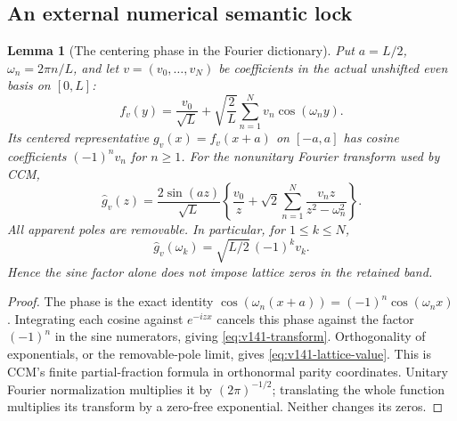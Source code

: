 \documentclass[11pt]{article}
\newtheorem{lemma}[theorem]{Lemma}
\theoremstyle{remark}
\begin{document}
\subsection*{An external numerical semantic lock}

\begin{lemma}[The centering phase in the Fourier dictionary]
\label{lem:v141-centering}
Put $a=L/2$, $\omega_n=2\pi n/L$, and let $v=(v_0,\ldots,v_N)$
be coefficients in the actual unshifted even basis on $[0,L]$:
\[
 f_v(y)=\frac{v_0}{\sqrt L}
       +\sqrt{\frac2L}\sum_{n=1}^Nv_n\cos(\omega_n y).
\]
Its centered representative $g_v(x)=f_v(x+a)$ on $[-a,a]$ has
cosine coefficients $(-1)^nv_n$ for $n\ge1$. For the nonunitary
Fourier transform used by CCM,
\begin{equation}\label{eq:v141-transform}
 \widehat g_v(z)=\frac{2\sin(az)}{\sqrt L}
 \left\{\frac{v_0}{z}+\sqrt2\sum_{n=1}^N
          \frac{v_nz}{z^2-\omega_n^2}\right\}.
\end{equation}
All apparent poles are removable. In particular, for $1\le k\le N$,
\begin{equation}\label{eq:v141-lattice-value}
 \widehat g_v(\omega_k)=\sqrt{L/2}\,(-1)^kv_k.
\end{equation}
Hence the sine factor alone does not impose lattice zeros in the
retained band.
\end{lemma}
\begin{proof}
The phase is the exact identity
$\cos(\omega_n(x+a))=(-1)^n\cos(\omega_nx)$.
Integrating each cosine against $e^{-izx}$ cancels this phase
against the factor $(-1)^n$ in the sine numerators, giving
\eqref{eq:v141-transform}. Orthogonality of exponentials, or the
removable-pole limit, gives \eqref{eq:v141-lattice-value}.
This is CCM's finite partial-fraction formula in orthonormal parity
coordinates. Unitary Fourier normalization multiplies it by
$(2\pi)^{-1/2}$; translating the whole function multiplies its
transform by a zero-free exponential. Neither changes its zeros.
\end{proof}
\end{document}
